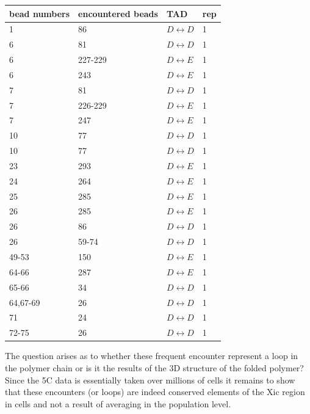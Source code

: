 \documentclass[12pt]{book}
\begin{document}
\begin{table}[H]\label{table_peaksOfTheEncounterDataTwoSided}
\begin{tabular}{l l l l}
bead numbers & encountered beads & TAD & rep\\
\hline
1       & 86      & $D\leftrightarrow D$& 1 \\
6       & 81      & $D\leftrightarrow D$& 1 \\
6       & 227-229 & $D\leftrightarrow E$& 1 \\
6       & 243     & $D\leftrightarrow E$& 1 \\
7       & 81      & $D\leftrightarrow D$& 1 \\
7       & 226-229 & $D\leftrightarrow E$& 1 \\
7       & 247     & $D\leftrightarrow E$& 1 \\
10      & 77      & $D\leftrightarrow D$& 1 \\
10      & 77      & $D\leftrightarrow D$& 1 \\
23      & 293     & $D\leftrightarrow E$& 1 \\
24      & 264     & $D\leftrightarrow E$& 1 \\
25      & 285     & $D\leftrightarrow E$& 1 \\
26      & 285     & $D\leftrightarrow E$& 1 \\
26      & 86      & $D\leftrightarrow D$& 1 \\
26      & 59-74   & $D\leftrightarrow D$& 1 \\
49-53   & 150     & $D\leftrightarrow E$& 1 \\
64-66   & 287     & $D\leftrightarrow E$& 1 \\
65-66   & 34      & $D\leftrightarrow D$& 1 \\ 
64,67-69& 26      & $D\leftrightarrow D$& 1 \\       
71      & 24      & $D\leftrightarrow D$& 1 \\
72-75   & 26      & $D\leftrightarrow D$& 1 \\

\end{tabular}
\end{table}

The question arises as to whether these frequent encounter represent a loop in the polymer chain or is it the results of the 3D structure of the folded polymer? Since the 5C data is essentially taken over millions of cells it remains to show that these encounters (or loops) are indeed conserved elements of the Xic region in cells and not a result of averaging in the population level.
\end{document}
